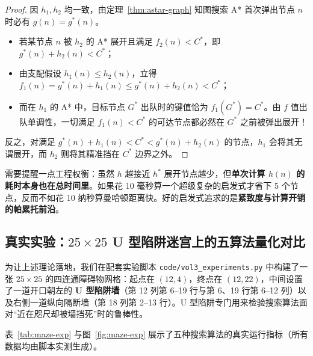 \begin{proof}
因 $h_1, h_2$ 均一致，由定理~\ref{thm:astar-graph} 知图搜索 A* 首次弹出节点 $n$ 时必有 $g(n) = g^*(n)$。
\begin{itemize}
  \item 若某节点 $n$ 被 $h_2$ 的 A* 展开且满足 $f_2(n) < C^*$，即 $g^*(n) + h_2(n) < C^*$；
  \item 由支配假设 $h_1(n) \le h_2(n)$，立得 $f_1(n) = g^*(n) + h_1(n) \le g^*(n) + h_2(n) < C^*$；
  \item 而在 $h_1$ 的 A* 中，目标节点 $G^*$ 出队时的键值恰为 $f_1(G^*) = C^*$。由 $f$ 值出队单调性，一切满足 $f_1(n) < C^*$ 的可达节点都必然在 $G^*$ 之前被弹出展开！
\end{itemize}
反之，对满足 $g^*(n) + h_1(n) < C^* < g^*(n) + h_2(n)$ 的节点，$h_1$ 会将其无谓展开，而 $h_2$ 则将其精准挡在 $C^*$ 边界之外。
\end{proof}

需要提醒一点工程权衡：虽然 $h$ 越接近 $h^*$ 展开节点越少，但\textbf{单次计算 $h(n)$ 的耗时本身也在总时间里}。如果花 10 毫秒算一个超级复杂的启发式才省下 5 个节点，反而不如花 10 纳秒算曼哈顿距离快。好的启发式追求的是\textbf{紧致度与计算开销的帕累托前沿}。

\subsection{真实实验：$25\times 25$ U 型陷阱迷宫上的五算法量化对比}

为让上述理论落地，我们在配套实验脚本 \texttt{code/vol3\_experiments.py} 中构建了一张 $25\times 25$ 的四连通障碍物网格：起点在 $(12, 4)$，终点在 $(12, 22)$，中间设置了一道开口朝左的 \textbf{U 型陷阱墙}（第 12 列第 6--19 行与第 6、19 行第 6--12 列）以及右侧一道纵向隔断墙（第 18 列第 2--13 行）。U 型陷阱专门用来检验搜索算法面对“近在咫尺却被墙挡死”时的鲁棒性。

表~\ref{tab:maze-exp} 与图~\ref{fig:maze-exp} 展示了五种搜索算法的真实运行指标（所有数据均由脚本实测生成）。

